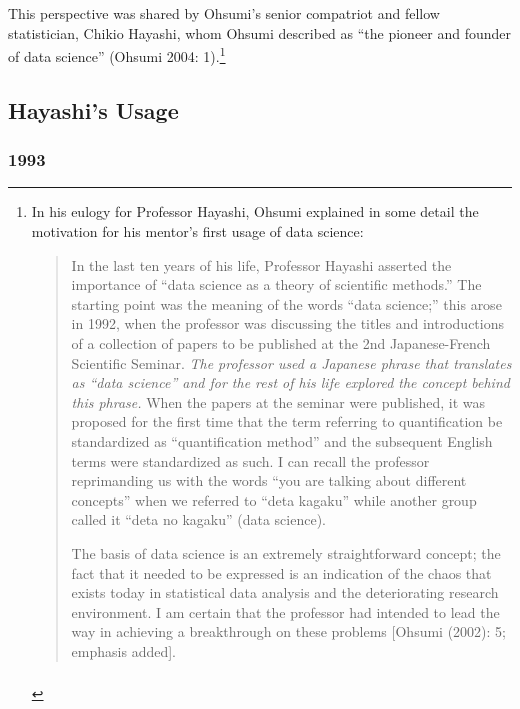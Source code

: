 \documentclass[
  letterpaper,
]{report}
\begin{document}
This perspective was shared by Ohsumi's senior compatriot and fellow
statistician, Chikio Hayashi, whom Ohsumi described as ``the pioneer and
founder of data science'' (Ohsumi 2004: 1).\footnote{In his eulogy for
  Professor Hayashi, Ohsumi explained in some detail the motivation for
  his mentor's first usage of data science:

  \begin{quote}
  In the last ten years of his life, Professor Hayashi asserted the
  importance of ``data science as a theory of scientific methods.'' The
  starting point was the meaning of the words ``data science;'' this
  arose in 1992, when the professor was discussing the titles and
  introductions of a collection of papers to be published at the 2nd
  Japanese-French Scientific Seminar. \emph{The professor used a
  Japanese phrase that translates as ``data science'' and for the rest
  of his life explored the concept behind this phrase.} When the papers
  at the seminar were published, it was proposed for the first time that
  the term referring to quantification be standardized as
  ``quantification method'' and the subsequent English terms were
  standardized as such. I can recall the professor reprimanding us with
  the words ``you are talking about different concepts'' when we
  referred to ``deta kagaku'' while another group called it ``deta no
  kagaku'' (data science).

  The basis of data science is an extremely straightforward concept; the
  fact that it needed to be expressed is an indication of the chaos that
  exists today in statistical data analysis and the deteriorating
  research environment. I am certain that the professor had intended to
  lead the way in achieving a breakthrough on these problems {[}Ohsumi
  (2002): 5; emphasis added{]}.
  \end{quote}

  \hypertarget{section}{%
  \subsubsection{}\label{section}}}

\hypertarget{hayashis-usage}{%
\subsection{Hayashi's Usage}\label{hayashis-usage}}

\hypertarget{section-1}{%
\subsubsection{1993}\label{section-1}}
\end{document}
